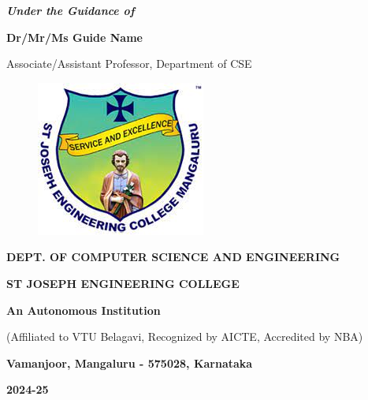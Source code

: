 \documentclass[12pt,a4paper]{report}
\begin{document}
\begin{center}
\vspace{12pt}
\textit{\textbf{Under the Guidance of}}
\par
\vspace{6pt}
\textbf{Dr/Mr/Ms Guide Name }
\par
\vspace{2pt}
\normalsize { Associate/Assistant Professor, Department of CSE }
\par
\begin{figure}[hbtp]
\centering
\includegraphics[scale=0.6]{./pic/sjeclogo}
\end{figure}
\large \textbf{DEPT. OF COMPUTER SCIENCE AND ENGINEERING}
\par \Large \textbf{ST JOSEPH ENGINEERING COLLEGE}
\par 
\textbf{An Autonomous Institution}
\par
\large{(Affiliated to VTU Belagavi, Recognized by AICTE, Accredited by NBA)}
\par
\vspace{3pt}
{\large \textbf{Vamanjoor, Mangaluru - 575028, Karnataka}}
\par 
\vspace{12pt}
{\Large \textbf{2024-25}}
\end{center}

\newpage


\end{document}
